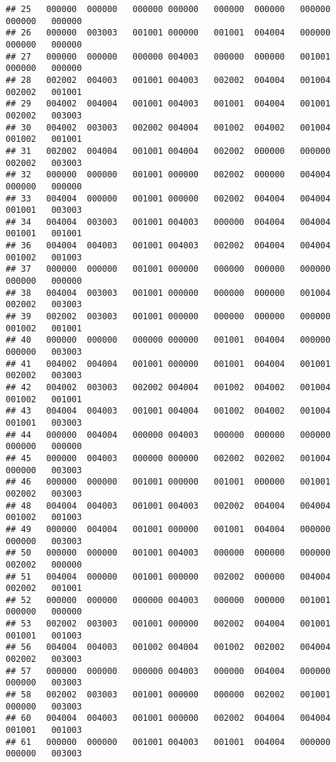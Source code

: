 \documentclass[
]{article}
\begin{document}
\begin{verbatim}
## 25   000000  000000   000000 000000   000000  000000   000000   000000   000000
## 26   000000  003003   001001 000000   001001  004004   000000   000000   000000
## 27   000000  000000   000000 004003   000000  000000   001001   000000   000000
## 28   002002  004003   001001 004003   002002  004004   001004   002002   001001
## 29   004002  004004   001001 004003   001001  004004   001001   002002   003003
## 30   004002  003003   002002 004004   001002  004002   001004   001002   001001
## 31   002002  004004   001001 004004   002002  000000   000000   002002   003003
## 32   000000  000000   001001 000000   002002  000000   004004   000000   000000
## 33   004004  000000   001001 000000   002002  004004   004004   001001   003003
## 34   004004  003003   001001 004003   000000  004004   004004   001001   001001
## 36   004004  004003   001001 004003   002002  004004   004004   001002   001003
## 37   000000  000000   001001 000000   000000  000000   000000   000000   000000
## 38   004004  003003   001001 000000   000000  000000   001004   002002   003003
## 39   002002  003003   001001 000000   000000  000000   000000   001002   001001
## 40   000000  000000   000000 000000   001001  004004   000000   000000   003003
## 41   004002  004004   001001 000000   001001  004004   001001   002002   003003
## 42   004002  003003   002002 004004   001002  004002   001004   001002   001001
## 43   004004  004003   001001 004004   001002  004002   001004   001001   003003
## 44   000000  004004   000000 004003   000000  000000   000000   000000   000000
## 45   000000  004003   000000 000000   002002  002002   001004   000000   003003
## 46   000000  000000   001001 000000   001001  000000   001001   002002   003003
## 48   004004  004003   001001 004003   002002  004004   004004   001002   001003
## 49   000000  004004   001001 000000   001001  004004   000000   000000   003003
## 50   000000  000000   001001 004003   000000  000000   000000   002002   000000
## 51   004004  000000   001001 000000   002002  000000   004004   002002   001001
## 52   000000  000000   000000 004003   000000  000000   001001   000000   000000
## 53   002002  003003   001001 000000   002002  004004   001001   001001   001003
## 56   004004  004003   001002 004004   001002  002002   004004   002002   003003
## 57   000000  000000   000000 004003   000000  004004   000000   000000   003003
## 58   002002  003003   001001 000000   000000  002002   001001   000000   003003
## 60   004004  004003   001001 000000   002002  004004   004004   001001   001003
## 61   000000  000000   001001 004003   001001  004004   000000   000000   003003

\end{verbatim}
\end{document}
